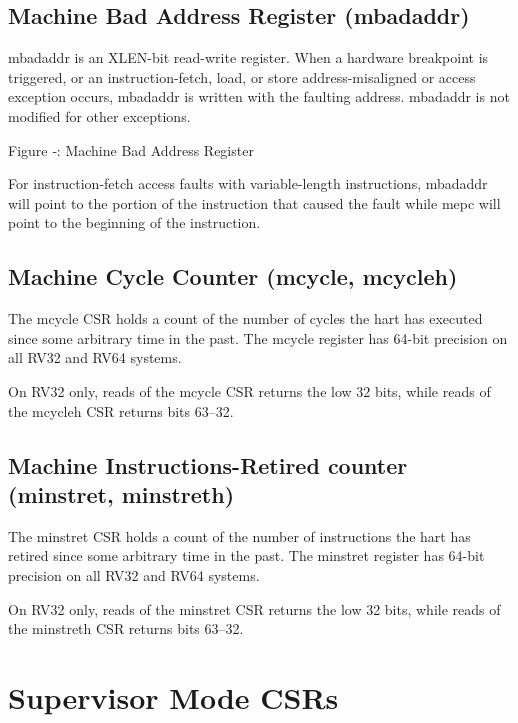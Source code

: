 \subsection{Machine Bad Address Register
(mbadaddr)}\label{machine-bad-address-register-mbadaddr}

mbadaddr is an XLEN-bit read-write register. When a hardware breakpoint
is triggered, or an instruction-fetch, load, or store address-misaligned
or access exception occurs, mbadaddr is written with the faulting
address. mbadaddr is not modified for other exceptions.

\missingfigure{}

Figure ‑: Machine Bad Address Register

For instruction-fetch access faults with variable-length instructions,
mbadaddr will point to the portion of the instruction that caused the
fault while mepc will point to the beginning of the instruction.

\subsection{Machine Cycle Counter (mcycle,
mcycleh)}\label{machine-cycle-counter-mcycle-mcycleh}

The mcycle CSR holds a count of the number of cycles the hart has
executed since some arbitrary time in the past. The mcycle register has
64-bit precision on all RV32 and RV64 systems.

On RV32 only, reads of the mcycle CSR returns the low 32 bits, while
reads of the mcycleh CSR returns bits 63--32.

\subsection{Machine Instructions-Retired counter (minstret,
minstreth)}\label{machine-instructions-retired-counter-minstret-minstreth}

The minstret CSR holds a count of the number of instructions the hart
has retired since some arbitrary time in the past. The minstret register
has 64-bit precision on all RV32 and RV64 systems.

On RV32 only, reads of the minstret CSR returns the low 32 bits, while
reads of the minstreth CSR returns bits 63--32.

\section{Supervisor Mode CSRs}\label{supervisor-mode-csrs}


